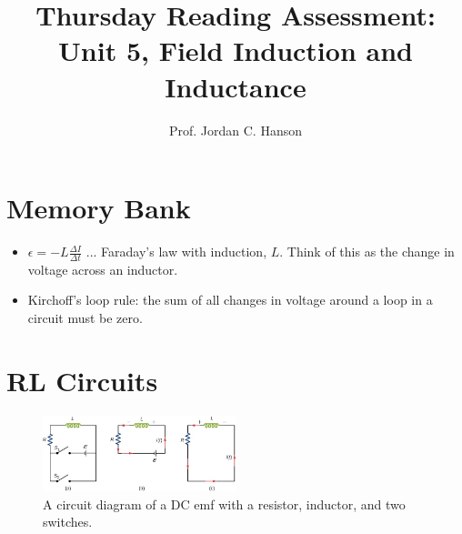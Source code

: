 \documentclass{article}
\begin{document}
\title{Thursday Reading Assessment: Unit 5, Field Induction and Inductance}
\author{Prof. Jordan C. Hanson}

\maketitle

\section{Memory Bank}

\begin{itemize}
\item $\epsilon = -L \frac{\Delta I}{\Delta t}$ ... Faraday's law with induction, $L$.  Think of this as the change in voltage across an inductor.
\item Kirchoff's loop rule: the sum of all changes in voltage around a loop in a circuit must be zero.
\end{itemize}

\section{RL Circuits}

\begin{figure}
\centering
\includegraphics[width=0.5\textwidth]{rl.jpeg}
\caption{\label{fig:rl} A circuit diagram of a DC emf with a resistor, inductor, and two switches.}
\end{figure}
\end{document}
